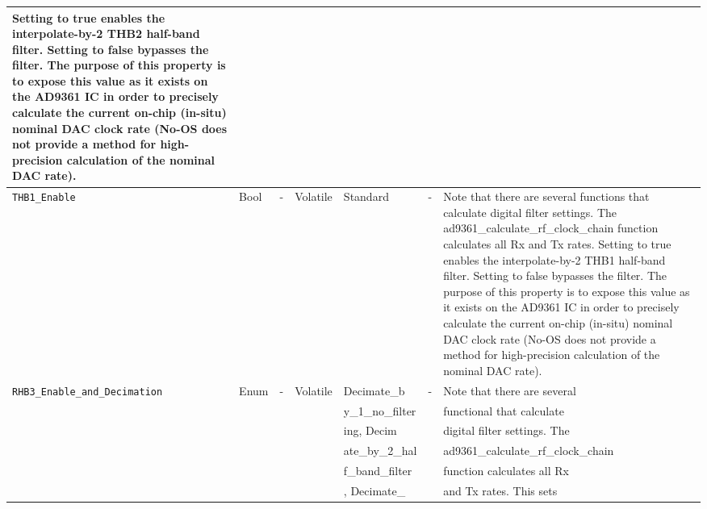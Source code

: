 \documentclass{article}
\begin{document}
\begin{landscape}
\begin{scriptsize}
\begin{longtable}{|p{3.6cm}|p{8.1cm}|p{1.4cm}|p{1.3cm}|p{1.4cm}|p{2.5cm}|p{3.6cm}|}
                                 Setting to true enables the interpolate-by-2
                                 THB2 half-band filter. Setting to false
                                 bypasses the filter. The purpose of this
                                 property is to expose this value as it exists
                                 on the AD9361 IC in order to precisely
                                 calculate the current on-chip (in-situ) nominal
                                 DAC clock rate (No-OS does not provide a method
                                 for high-precision calculation of the nominal
                                 DAC rate). \\
			\hline
			\verb+THB1_Enable+ & Bool & - & Volatile & Standard & - &
                               Note that there are several
                                 functions that calculate digital filter
                                 settings. The ad9361\_calculate\_rf\_clock\_chain
                                 function calculates all Rx and Tx rates.
                                 Setting to true enables the interpolate-by-2
                                 THB1 half-band filter. Setting to false
                                 bypasses the filter. The purpose of this
                                 property is to expose this value as it exists
                                 on the AD9361 IC in order to precisely
                                 calculate the current on-chip (in-situ) nominal
                                 DAC clock rate (No-OS does not provide a method
                                 for high-precision calculation of the nominal
                                 DAC rate). \\
			\hline
			\verb+RHB3_Enable_and_Decimation+ & Enum & - & Volatile & Decimate\_b & - &  Note that there are several \\
			                              &      &   &          & y\_1\_no\_filter      &   & functional that calculate \\
			                              &      &   &          & ing, Decim           &   & digital filter settings. The \\
			                              &      &   &          & ate\_by\_2\_hal    &   &  ad9361\_calculate\_rf\_clock\_chain \\
			                              &      &   &          & f\_band\_filter   &   &  function calculates all Rx \\
			                              &      &   &          & , Decimate\_      &   &  and Tx rates. This sets \\

\end{longtable}
\end{scriptsize}
\end{landscape}
\end{document}

